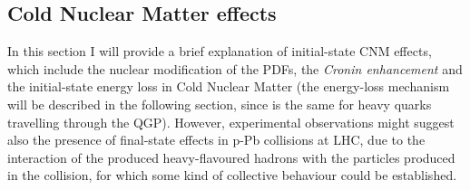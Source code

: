 \documentclass[b5paper,10pt,twoside,oldstyle,classica]{toptesi}
\begin{document}
\subsection{Cold Nuclear Matter effects}
\label{CNM_sec}
In this section I will provide a brief explanation of initial-state CNM effects, which include the nuclear modification of the PDFs, the \textit{Cronin enhancement} and the initial-state energy loss in Cold Nuclear Matter (the energy-loss mechanism will be described in the following section, since is the same for heavy quarks travelling through the QGP). However, experimental observations might suggest also the presence of final-state effects in p-Pb collisions at LHC, due to the interaction of the produced heavy-flavoured hadrons with the particles produced in the collision, for which some kind of collective behaviour could be established.  
\end{document}
